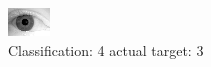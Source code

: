 \begin{figure}[h!]
\begin{center}
\includegraphics[width=0.60\columnwidth]{figures/ID2197_class_4_target_3.png}
\end{center}
\caption{ Classification: 4 actual target: 3}
\label{fig:ID2197_class_4_target_3}
\end{figure}
